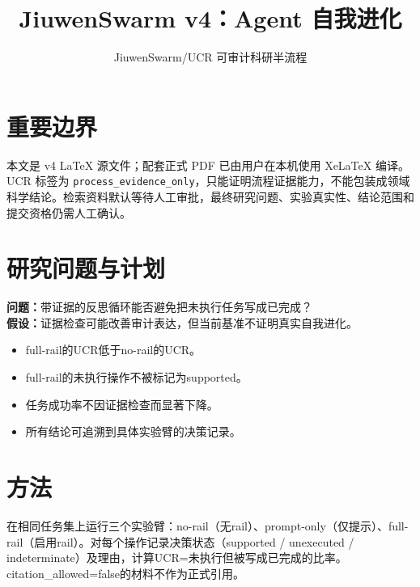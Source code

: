 \documentclass[UTF8]{ctexart}
\title{JiuwenSwarm v4：Agent 自我进化}
\author{JiuwenSwarm/UCR 可审计科研半流程}
\date{}
\begin{document}
\maketitle
\section{重要边界}
本文是 v4 LaTeX 源文件；配套正式 PDF 已由用户在本机使用 XeLaTeX 编译。UCR 标签为 \texttt{process\_evidence\_only}，只能证明流程证据能力，不能包装成领域科学结论。检索资料默认等待人工审批，最终研究问题、实验真实性、结论范围和提交资格仍需人工确认。
\section{研究问题与计划}
\textbf{问题：}带证据的反思循环能否避免把未执行任务写成已完成？\\
\textbf{假设：}证据检查可能改善审计表达，但当前基准不证明真实自我进化。
\begin{itemize}
\item full-\allowbreak{}rail的UCR低于no-\allowbreak{}rail的UCR。
\item full-\allowbreak{}rail的未执行操作不被标记为supported。
\item 任务成功率不因证据检查而显著下降。
\item 所有结论可追溯到具体实验臂的决策记录。
\end{itemize}
\section{方法}
在相同任务集上运行三个实验臂：no-\allowbreak{}rail（无rail）、prompt-\allowbreak{}only（仅提示）、full-\allowbreak{}rail（启用rail）。对每个操作记录决策状态（supported / unexecuted / indeterminate）及理由，计算UCR=未执行但被写成已完成的比率。citation\_\allowbreak{}allowed=false的材料不作为正式引用。
\end{document}
